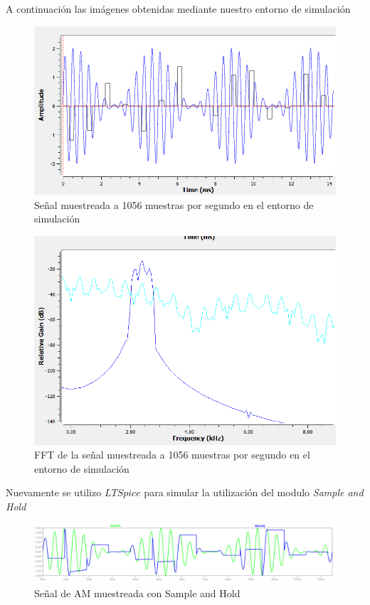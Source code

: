 A continuación las imágenes obtenidas mediante nuestro entorno de simulación
\begin{figure}[H]
	\centering
	\includegraphics[width=\linewidth]{ImagenesEjercicio8/MuestreoNatural1056timeGNURADIO.png}
	\caption{Señal muestreada a 1056 muestras por segundo en el entorno de simulación}
	\label{fig:AMmuestreonatural1056timeGNU}
\end{figure}
\begin{figure}[H]
	\centering
	\includegraphics[width=\linewidth]{ImagenesEjercicio8/FFT1056_MuestreoNaturalGNURADIO.png}
	\caption{FFT de la señal muestreada a 1056 muestras por segundo en el entorno de simulación}
	\label{fig:FFT_muestreonatural1056timeGNU}
\end{figure}


Nuevamente se utilizo $LTSpice$ para simular la utilización del modulo \textit{Sample and Hold}

\begin{figure}[H]
	\centering
	\includegraphics[width=\linewidth]{ImagenesEjercicio8/MuestreoSH1056time}
	\caption{Señal de AM muestreada con Sample and Hold}
	\label{fig:muestreosh1056time}
\end{figure}

